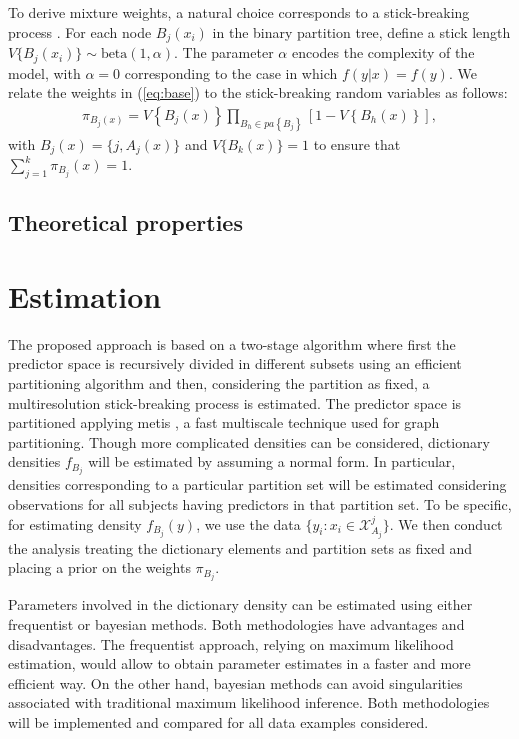 \documentclass{article}
\begin{document}
To derive mixture weights, a natural choice corresponds to a stick-breaking process \cite{stickbreaking}.  For each node $B_j(x_i)$ in the binary partition tree, define a stick length $V\{B_j(x_i)\} \sim \mbox{beta}(1,\alpha)$.  The parameter $\alpha$ encodes the complexity of the model, with $\alpha = 0$ corresponding to the case in which $f(y|x) = f(y)$.  We relate the weights in (\ref{eq:base}) to the stick-breaking random variables as follows: 
\begin{eqnarray*}
\pi_{B_j(x)} = V\left\{B_j(x)\right\} \prod_{B_h \in pa\left\{B_j\right\}} \left[1 - V\left\{B_h(x)\right\}\right],
\end{eqnarray*}
with $B_j(x)=\{j,A_j(x)\}$ and $V\{B_k(x)\}=1$ to ensure that $\sum_{j=1}^k \pi_{B_j}(x) = 1$.    
\vskip 12pt

\subsection{Theoretical properties} 

\section{Estimation}

The proposed approach is based on a two-stage algorithm where first the predictor space is recursively divided in different subsets using an efficient partitioning algorithm and then, considering the partition as fixed, a multiresolution stick-breaking process is estimated.  The predictor space is partitioned applying metis \cite{metis}, a fast multiscale technique used for graph partitioning. Though more complicated densities can be considered, dictionary densities $f_{B_j}$ will be estimated by assuming a normal form. In particular, densities corresponding to a particular partition set will be estimated considering observations for all subjects having predictors in that partition set. To be specific, for estimating density $f_{B_j}(y)$, we use the data $\{ y_i: x_i \in \mathcal{X}^j_{A_j} \}$. We then conduct the analysis treating the dictionary elements and partition sets as fixed and placing a prior on the weights $\pi_{B_j}$. 

Parameters involved in the dictionary density can be estimated using either frequentist or bayesian methods. Both methodologies have advantages and disadvantages. The frequentist approach, relying on maximum likelihood estimation, would allow to obtain parameter estimates in a faster and more efficient way. On the other hand, bayesian methods can avoid singularities associated with traditional maximum likelihood inference. Both methodologies will be implemented and compared for all data examples considered.
\end{document}
